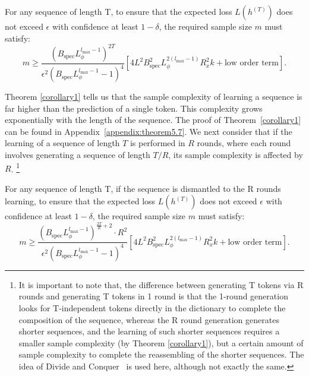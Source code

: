 \begin{theorem}\label{corollary1} For any sequence of length T, to ensure that the expected loss \( L(h^{(T)}) \) does not exceed \( \epsilon \) with confidence at least \( 1 - \delta \),  the required sample size \( m \) must satisfy:
    \[
m \geq \frac{\left( B_{\text{spec}} L_{\phi}^{l_{\text{max}}-1} \right)^{2T}}{\epsilon^{2} \left( B_{\text{spec}} L_{\phi}^{l_{\text{max}}-1} - 1 \right)^{4}} \left[ 4 L^2 B_{\text{spec}}^2 L_{\phi}^{2(l_{\text{max}}-1)} R_x^2 k + \text{low order term} \right]. 
\]
\end{theorem}

Theorem \ref{corollary1} tells us that the sample complexity of learning a sequence is far higher than the prediction of a single token. This complexity grows exponentially with the length of the sequence. The proof of Theorem~\ref{corollary1} can be found in Appendix~\ref{appendix:theorem5.7}.  
We next consider that if the learning of a sequence of length \(T\) is performed in \(R\) rounds, where each round involves generating a sequence of length \(T/R\), its sample complexity is affected by \(R\). %
\footnote{{\color{black}It is important to note that, the difference between generating T tokens via R rounds and generating T tokens in 1 round is that the 1-round generation looks for T-independent tokens directly in the dictionary to complete the composition of the sequence, whereas the R round generation generates shorter sequences, and the learning of such shorter sequences requires a smaller sample complexity (by Theorem \ref{corollary1}), but a certain amount of sample complexity to complete the reassembling of the shorter sequences. The idea of Divide and Conquer~\cite{cormen2022introduction} is used here, although not exactly the same.
}}

\begin{theorem}\label{theorem5.9}
   For any sequence of length T, if the sequence is dismantled to the R rounds learning, to ensure that the expected loss \( L(h^{(T)}) \) does not exceed \( \epsilon \) with confidence at least \( 1 - \delta \),  the required sample size \( m \) must satisfy:
   \[
m \geq  \frac{\left(B_{\text{spec}} L_{\phi}^{l_{\text{max}}-1}\right)^{\frac{2T}{R}+2} \cdot R^2 }{\epsilon^2 (B_{\text{spec}} L_{\phi}^{l_{\text{max}}-1} - 1)^4}  \left[ 4 L^2 B_{\text{spec}}^2 L_{\phi}^{2(l_{\text{max}}-1)} R_x^2 k + \text{low order term} \right].
\]
\end{theorem}

